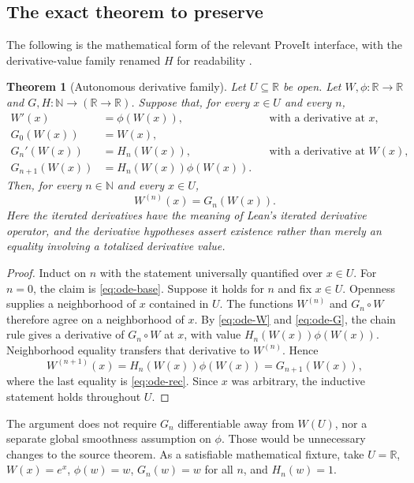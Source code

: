 \documentclass[11pt,letterpaper]{article}
\newcommand{\N}{\mathbb N}\newcommand{\Z}{\mathbb Z}\newcommand{\Q}{\mathbb Q}\newcommand{\R}{\mathbb R}
\newtheorem{theorem}{Theorem}[section]
\theoremstyle{definition}\newtheorem{definition}[theorem]{Definition}
\theoremstyle{remark}\newtheorem{remark}[theorem]{Remark}
\begin{document}
\subsection{The exact theorem to preserve}
The following is the mathematical form of the relevant ProveIt interface,
with the derivative-value family renamed $H$ for readability \cite{ode}.
\begin{theorem}[Autonomous derivative family]
Let $U\subseteq\R$ be open. Let $W,\phi:\R\to\R$ and
$G,H:\N\to(\R\to\R)$. Suppose that, for every $x\in U$ and every $n$,
\begin{align}
 W'(x)&=\phi(W(x)), &&\text{with a derivative at }x,\label{eq:ode-W}\\
 G_0(W(x))&=W(x),\label{eq:ode-base}\\
 G_n'(W(x))&=H_n(W(x)), &&\text{with a derivative at }W(x),\label{eq:ode-G}\\
 G_{n+1}(W(x))&=H_n(W(x))\phi(W(x)).\label{eq:ode-rec}
\end{align}
Then, for every $n\in\N$ and every $x\in U$,
\[
 W^{(n)}(x)=G_n(W(x)).
\]
Here the iterated derivatives have the meaning of Lean's iterated derivative
operator, and the derivative hypotheses assert existence rather than merely
an equality involving a totalized derivative value.
\end{theorem}
\begin{proof}
Induct on $n$ with the statement universally quantified over $x\in U$.
For $n=0$, the claim is \eqref{eq:ode-base}. Suppose it holds for $n$ and
fix $x\in U$. Openness supplies a neighborhood of $x$ contained in $U$.
The functions $W^{(n)}$ and $G_n\circ W$ therefore agree on a neighborhood
of $x$. By \eqref{eq:ode-W} and \eqref{eq:ode-G}, the chain rule gives a
derivative of $G_n\circ W$ at $x$, with value
$H_n(W(x))\phi(W(x))$. Neighborhood equality transfers that derivative to
$W^{(n)}$. Hence
\[
 W^{(n+1)}(x)=H_n(W(x))\phi(W(x))=G_{n+1}(W(x)),
\]
where the last equality is \eqref{eq:ode-rec}. Since $x$ was arbitrary, the
inductive statement holds throughout $U$.
\end{proof}

The argument does not require $G_n$ differentiable away from $W(U)$, nor a
separate global smoothness assumption on $\phi$. Those would be unnecessary
changes to the source theorem. As a satisfiable mathematical fixture, take
$U=\R$, $W(x)=e^x$, $\phi(w)=w$, $G_n(w)=w$ for all $n$, and $H_n(w)=1$.
\end{document}
